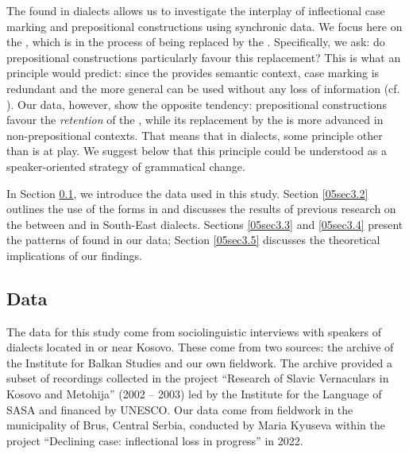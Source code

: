 \documentclass[output=paper,colorlinks,citecolor=brown]{langscibook}
\begin{document}
The  found in  dialects allows us to investigate the interplay of inflectional case marking and prepositional constructions using synchronic data. We focus here on the , which is in the process of being replaced by the . Specifically, we ask: do prepositional constructions particularly favour this replacement? This is what an  principle would predict: since the  provides semantic context,  case marking is redundant and the more general   can be used without any loss of information (cf. \citealt{comrie1977, comrie1989}). Our data, however, show the opposite tendency: prepositional constructions favour the \emph{retention} of the , while its replacement by the  is more advanced in non-prepositional contexts. That means that in  dialects, some principle other than  is at play. We suggest below that this principle could be understood as a speaker-oriented strategy of grammatical change.

In Section \ref{05sec3.1}, we introduce the data used in this  study. Section \ref{05sec3.2} outlines the use of the  forms in  and discusses the results of previous research on the  between  and  in South-East  dialects. Sections \ref{05sec3.3} and \ref{05sec3.4} present the patterns of  found in our data; Section \ref{05sec3.5} discusses the theoretical implications of our findings.

\subsection{Data} \label{05sec3.1}

The data for this study come from sociolinguistic interviews with speakers of  dialects located in or near Kosovo. These come from two sources: the archive of the Institute for Balkan Studies and our own fieldwork. The archive provided a subset of recordings collected in the project ``Research of Slavic Vernaculars in Kosovo and Metohija'' (2002 -- 2003) led by the Institute for the  Language of SASA and financed by UNESCO. Our data come from fieldwork in the municipality of Brus, Central Serbia, conducted by Maria Kyuseva within the project ``Declining case: inflectional loss in progress'' in 2022.
\end{document}
